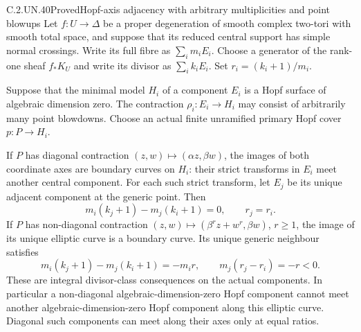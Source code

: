 \begin{statement}{C.2.UN.40}{Proved}{Hopf-axis adjacency with arbitrary multiplicities and point blowups}
Let $f:U\to\Delta$ be a proper degeneration of smooth complex
two-tori with smooth total space, and suppose that its reduced
central support has simple normal crossings. Write its full
fibre as $\sum_i m_iE_i$. Choose a generator of the rank-one
sheaf $f_*K_U$ and write its divisor as $\sum_i k_iE_i$.
Set $r_i=(k_i+1)/m_i$.

Suppose that the minimal model $H_i$ of a component $E_i$
is a Hopf surface of algebraic dimension zero. The contraction
$\rho_i:E_i\to H_i$ may consist of arbitrarily many point
blowdowns. Choose an actual finite unramified primary Hopf
cover $p:P\to H_i$.

If $P$ has diagonal contraction $(z,w)\mapsto(\alpha z,\beta w)$,
the images of both coordinate axes are boundary curves on
$H_i$: their strict transforms in $E_i$ meet another central
component. For each such strict transform, let $E_j$ be its
unique adjacent component at the generic point. Then
\[
                 m_i(k_j+1)-m_j(k_i+1)=0,
                 \qquad r_j=r_i.
\tag{C.HA.1}
\]
If $P$ has non-diagonal contraction
$(z,w)\mapsto(\beta^r z+w^r,\beta w)$, $r\geq1$, the image
of its unique elliptic curve is a boundary curve. Its unique
generic neighbour satisfies
\[
       m_i(k_j+1)-m_j(k_i+1)=-m_i r,
       \qquad m_j(r_j-r_i)=-r<0.
\tag{C.HA.2}
\]
These are integral divisor-class consequences on the actual
components. In particular a non-diagonal algebraic-dimension-zero
Hopf component cannot meet another algebraic-dimension-zero
Hopf component along this elliptic curve. Diagonal such
components can meet along their axes only at equal ratios.
\end{statement}

